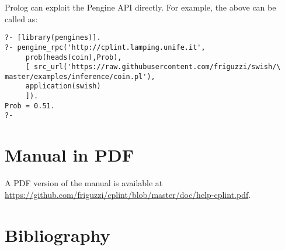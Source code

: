 \documentclass[a4paper,10pt]{scrartcl}
\begin{document}
Prolog can exploit the Pengine API directly.  For example, the above can
be called as:
\begin{verbatim}
?- [library(pengines)].
?- pengine_rpc('http://cplint.lamping.unife.it',
     prob(heads(coin),Prob),
     [ src_url('https://raw.githubusercontent.com/friguzzi/swish/\  
master/examples/inference/coin.pl'),
     application(swish)
     ]).
Prob = 0.51.
?-
\end{verbatim}

\section{Manual in PDF}
A PDF version of the manual is available at
\url{https://github.com/friguzzi/cplint/blob/master/doc/help-cplint.pdf}.
\section{Bibliography}


\end{document}
